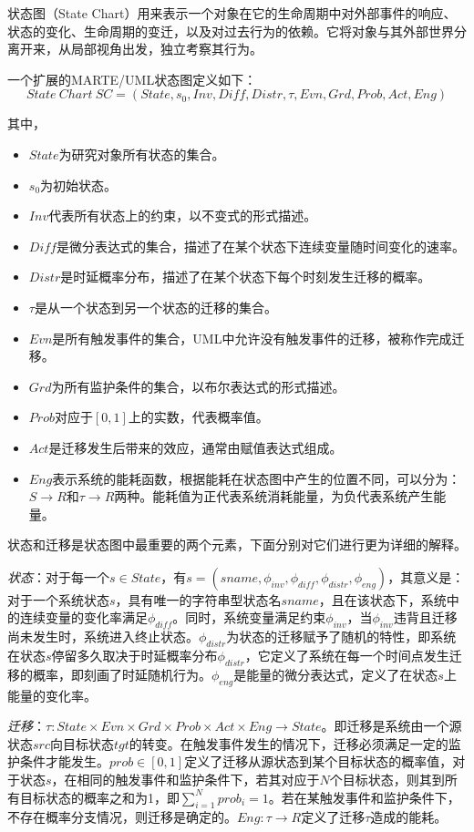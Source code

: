 	状态图（State Chart）用来表示一个对象在它的生命周期中对外部事件的响应、状态的变化、生命周期的变迁，以及对过去行为的依赖。它将对象与其外部世界分离开来，从局部视角出发，独立考察其行为。
	
	一个扩展的MARTE/UML状态图定义如下：
	\begin{equation}
	State\ Chart\ SC=(State, s_{0}, Inv, Diff, Distr, \tau, Evn, Grd, Prob, Act,Eng)
	\end{equation}
	
	其中，
	\begin{itemize}
	\item $State$为研究对象所有状态的集合。
	\item $s_{0}$为初始状态。
	\item $Inv$代表所有状态上的约束，以不变式的形式描述。
	\item $Diff$是微分表达式的集合，描述了在某个状态下连续变量随时间变化的速率。
	\item $Distr$是时延概率分布，描述了在某个状态下每个时刻发生迁移的概率。
	\item $\tau$是从一个状态到另一个状态的迁移的集合。
	\item $Evn$是所有触发事件的集合，UML中允许没有触发事件的迁移，被称作完成迁移。
	\item $Grd$为所有监护条件的集合，以布尔表达式的形式描述。
	\item $Prob$对应于$[ 0,1 ]$上的实数，代表概率值。
	\item $Act$是迁移发生后带来的效应，通常由赋值表达式组成。
	\item $Eng$表示系统的能耗函数，根据能耗在状态图中产生的位置不同，可以分为：$S \rightarrow R$和$\tau \rightarrow R$两种。能耗值为正代表系统消耗能量，为负代表系统产生能量。
	\end{itemize}
	
	状态和迁移是状态图中最重要的两个元素，下面分别对它们进行更为详细的解释。
	
	\emph{状态}：对于每一个$s \in State$，有$s = (sname,\phi_{inv},\phi_{diff},\phi_{distr}, \phi_{eng})$，其意义是：对于一个系统状态$s$，具有唯一的字符串型状态名$sname$，且在该状态下，系统中的连续变量的变化率满足$\phi_{diff}$。同时，系统变量满足约束$\phi_{inv}$，当$\phi_{inv}$违背且迁移尚未发生时，系统进入终止状态。$\phi_{distr}$为状态的迁移赋予了随机的特性，即系统在状态$s$停留多久取决于时延概率分布$\phi_{distr}$，它定义了系统在每一个时间点发生迁移的概率，即刻画了时延随机行为。$\phi_{eng}$是能量的微分表达式，定义了在状态$s$上能量的变化率。
	
	\emph{迁移}：$\tau:State \times Evn \times Grd \times Prob \times Act \times Eng \rightarrow State$。即迁移是系统由一个源状态$src$向目标状态$tgt$的转变。在触发事件发生的情况下，迁移必须满足一定的监护条件才能发生。$prob\in[0,1]$定义了迁移从源状态到某个目标状态的概率值，对于状态$s$，在相同的触发事件和监护条件下，若其对应于$N$个目标状态，则其到所有目标状态的概率之和为1，即$\sum_{i=1}^N prob_{i} =1$。若在某触发事件和监护条件下，不存在概率分支情况，则迁移是确定的。$Eng:\tau \rightarrow R$定义了迁移$\tau$造成的能耗。
	
